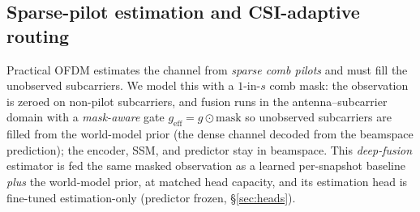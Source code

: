 \documentclass[11pt]{article}
\begin{document}
\subsection{Sparse-pilot estimation and CSI-adaptive routing}\label{sec:sparse}
Practical OFDM estimates the channel from \emph{sparse comb pilots} and must fill the unobserved
subcarriers. We model this with a $1$-in-$s$ comb mask: the observation is zeroed on non-pilot
subcarriers, and fusion runs in the antenna--subcarrier domain with a \emph{mask-aware} gate
$g_{\text{eff}}=g\odot\text{mask}$ so unobserved subcarriers are filled from the world-model prior
(the dense channel decoded from the beamspace prediction); the encoder, SSM, and predictor stay in
beamspace. This \emph{deep-fusion} estimator is fed the same masked observation as a learned
per-snapshot baseline \emph{plus} the world-model prior, at matched head capacity, and its estimation
head is fine-tuned estimation-only (predictor frozen, \S\ref{sec:heads}).
\end{document}
